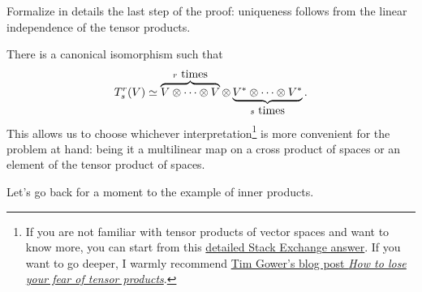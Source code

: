 \begin{exercise}
  Formalize in details the last step of the proof: uniqueness follows from the linear independence of the tensor products.
\end{exercise}

\begin{remark}
  There is a canonical isomorphism such that
  \begin{equation}
    T^r_s(V) \simeq \LaTeXoverbrace{V\otimes \cdots \otimes V}^{r\mbox{ times}} \otimes \LaTeXunderbrace{V^*\otimes \cdots \otimes V^*}_{s\mbox{ times}}.
  \end{equation}
  This allows us to choose whichever interpretation\footnote{If you are not familiar with tensor products of vector spaces and want to know more, you can start from this \href{https://web.archive.org/web/20231106094511/https://math.stackexchange.com/questions/2138459/understanding-the-definition-of-tensors-as-multilinear-maps/2141663\#2141663}{detailed Stack Exchange answer}. If you want to go deeper, I warmly recommend \href{https://web.archive.org/web/20230922070935/https://www.dpmms.cam.ac.uk/~wtg10/tensors3.html}{Tim Gower's blog post \emph{How to lose your fear of tensor products}}.} is more convenient for the problem at hand: being it a multilinear map on a cross product of spaces or an element of the tensor product of spaces.
\end{remark}

Let's go back for a moment to the example of inner products.

